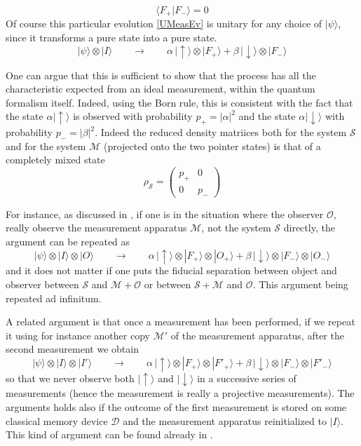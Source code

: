 \begin{equation}
\label{ }
\langle F_+ | F_-\rangle=0
\end{equation}
Of course this particular evolution \ref{UMeasEv} is unitary for any choice of $|\psi\rangle$, since it transforms a pure state into a pure state.
\begin{equation}
\label{vNDecProj}
|\psi\rangle\otimes |I\rangle
\qquad\to\qquad
\alpha\,|{\uparrow}\rangle\otimes |F_+\rangle + \beta\, |{\downarrow}\rangle\otimes|F_-\rangle
\end{equation}

One can argue that this is sufficient to show that the process has all the characteristic expected from an ideal measurement, within the quantum formalism itself. Indeed, using the Born rule, this is consistent with the fact that the state $\alpha|{\uparrow}\rangle$ is observed with probability $p_+=|\alpha|^2$ and the state $\alpha|{\downarrow}\rangle$ with probability $p_-=|\beta|^2$. 
Indeed the reduced density matriices both for the system $\mathcal{S}$ and for the system $\mathcal{M}$ (projected onto the two pointer states) is that of a completely mixed state
\begin{equation}
\label{ }
\rho_\mathcal{S}=
\begin{pmatrix}
   p_+   &    0\\
   0   &  p_-
\end{pmatrix}
\end{equation}

For instance, as discussed in   \cite{vonNeumann32G}\cite{vonNeumann32}, if one is in the situation where the observer $\mathcal{O}$, really observe the measurement apparatus $\mathcal{M}$, not the system $\mathcal{S}$ directly, the argument can be repeated as
\begin{equation}
\label{ }
|\psi\rangle\otimes |I\rangle\otimes |O\rangle
\qquad\to\qquad
\alpha\, | {\uparrow}\rangle \otimes |F_+\rangle \otimes |O_+\rangle + \beta\,  |{\downarrow}\rangle\otimes|F_-\rangle \otimes |O_-\rangle
\end{equation}
and it does not matter if one puts the fiducial separation between object and observer between $\mathcal{S}$ and $\mathcal{M}+\mathcal{O}$ or between $\mathcal{S}+\mathcal{M}$ and $\mathcal{O}$. This argument being repeated ad infinitum.

A related argument is that once a measurement has been performed, if we repeat it using for instance another copy $\mathcal{M}'$ of the measurement apparatus, after the second measurement we obtain
\begin{equation}
\label{ }
|\psi\rangle\otimes |I\rangle\otimes |  I' \rangle\qquad\to\qquad\alpha\, |{\uparrow}\rangle\otimes |F_+\rangle \otimes |F'_+\rangle+ \beta \, |{\downarrow}\rangle\otimes|F_-\rangle\otimes|F'_-\rangle
\end{equation}
so that we never observe both  $|{\uparrow}\rangle$ and  $|{\downarrow}\rangle$ in a successive series of measurements (hence the measurement is really a projective measurements). 
The arguments holds also if the outcome of the first measurement is stored on some classical memory device $\mathcal{D}$ and the measurement apparatus reinitialized to $|I\rangle$.
This kind of argument can be found already in 
\cite{Mott29}.

